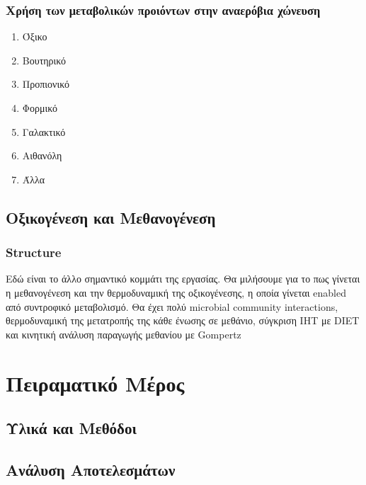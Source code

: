 \documentclass[11pt]{report}
\begin{document}
\section{Χρήση των μεταβολικών προιόντων στην αναερόβια χώνευση}
\label{sec:orga43585d}
\begin{enumerate}
\item Όξικο
\label{sec:orga77ae7b}
\item Βουτηρικό
\label{sec:orge264703}
\item Προπιονικό
\label{sec:orgb00b0ba}
\item Φορμικό
\label{sec:orgf4ebede}
\item Γαλακτικό
\label{sec:org9037caf}
\item Αιθανόλη
\label{sec:orga0904da}
\item Άλλα
\label{sec:org2ac632c}
\end{enumerate}

\chapter{Οξικογένεση και Μεθανογένεση}
\label{sec:org5a0b516}
\label{sec:methanogenesis}

\section{Structure}
\label{sec:org27dcec0}
Εδώ είναι το άλλο σημαντικό κομμάτι της εργασίας. Θα μιλήσουμε για το πως γίνεται η μεθανογένεση και την θερμοδυναμική της οξικογένεσης, η οποία γίνεται enabled από συντροφικό μεταβολισμό. Θα έχει πολύ microbial community interactions, θερμοδυναμική της μετατροπής της κάθε ένωσης σε μεθάνιο, σύγκριση IHT με DIET και κινητική ανάλυση παραγωγής μεθανίου με Gompertz

\part{Πειραματικό Μέρος}
\label{sec:org3f1a73d}
\chapter{Υλικά και Μεθόδοι}
\label{sec:org90aebb2}
\label{sec:materials_methods}

\chapter{Ανάλυση Αποτελεσμάτων}
\label{sec:org76ce070}
\label{sec:result_analysis}
\end{document}
